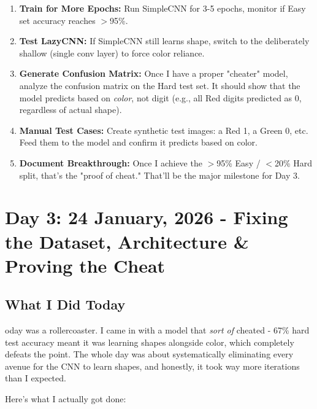 \documentclass[9pt,a4paper,twocolumn,twoside]{tau-class/tau}
\begin{document}
        \begin{enumerate}
            \item \textbf{Train for More Epochs:} Run SimpleCNN for 3-5 epochs, monitor if Easy set accuracy reaches $>$95\%.
            
            \item \textbf{Test LazyCNN:} If SimpleCNN still learns shape, switch to the deliberately shallow  (single conv layer) to force color reliance.
            
            \item \textbf{Generate Confusion Matrix:} Once I have a proper "cheater" model, analyze the confusion matrix on the Hard test set. It should show that the model predicts based on \textit{color}, not digit (e.g., all Red digits predicted as 0, regardless of actual shape).
            
            \item \textbf{Manual Test Cases:} Create synthetic test images: a Red 1, a Green 0, etc. Feed them to the model and confirm it predicts based on color.
            
            \item \textbf{Document Breakthrough:} Once I achieve the $>$95\% Easy / $<$20\% Hard split, that's the "proof of cheat." That'll be the major milestone for Day 3.
        \end{enumerate}


\section{Day 3: 24 January, 2026 - Fixing the Dataset, Architecture \& Proving the Cheat}

    \subsection{What I Did Today}

        oday was a rollercoaster. I came in with a model that \textit{sort of} cheated - 67\% hard test accuracy meant it was learning shapes alongside color, which completely defeats the point. The whole day was about systematically eliminating every avenue for the CNN to learn shapes, and honestly, it took way more iterations than I expected.

        Here's what I actually got done:
\end{document}
